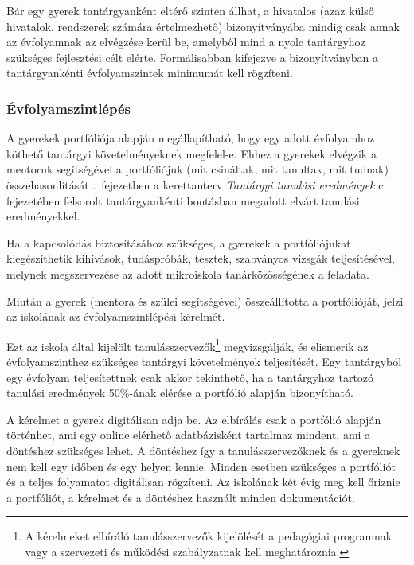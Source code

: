 Bár egy gyerek tantárgyanként eltérő szinten állhat, a hivatalos (azaz külső hivatalok, rendszerek számára értelmezhető) bizonyítványába mindig csak annak az évfolyamnak az elvégzése kerül be, amelyből mind a nyolc tantárgyhoz szükséges fejlesztési célt elérte. Formálisabban kifejezve a bizonyítványban a tantárgyankénti évfolyamszintek minimumát kell rögzíteni.

\subsubsection{Évfolyamszintlépés}
\label{sec:evfolyamszintlepes}
A gyerekek portfóliója alapján megállapítható, hogy egy adott évfolyamhoz köthető tantárgyi követelményeknek megfelel-e. Ehhez a gyerekek elvégzik a mentoruk segítségével a portfóliójuk (mit csináltak, mit tanultak, mit tudnak) összehasonlítását \ifkerettanterv
      .~fejezetben
\else
      a kerettanterv \emph{Tantárgyi tanulási eredmények} c. fejezetében
\fi felsorolt tantárgyankénti bontásban megadott elvárt tanulási eredményekkel.

Ha a kapcsolódás biztosításához szükséges, a gyerekek a portfóliójukat kiegészíthetik kihívások, tudáspróbák, tesztek, szabványos vizsgák teljesítésével, melynek megszervezése az adott mikroiskola tanárközösségének a feladata.

Miután a gyerek (mentora és szülei segítségével) összeállította a portfólió\-ját, jelzi az iskolának az évfolyamszintlépési kérelmét.

Ezt az iskola által kijelölt tanulásszervezők\footnote{A kérelmeket elbíráló tanulásszervezők kijelölését a pedagógiai programnak vagy a szervezeti és működési szabályzatnak kell meghatároznia.}   megvizsgálják, és elismerik az évfolyamszinthez szükséges tantárgyi követelmények teljesítését. Egy tantárgyból egy évfolyam teljesítettnek csak akkor tekinthető, ha a tantárgyhoz tartozó tanulási eredmények 50\%-ának elérése a portfólió alapján bizonyítható.

A kérelmet a gyerek digitálisan adja be. Az elbírálás csak a portfólió alapján történhet, ami egy online elérhető adatbázisként tartalmaz mindent, ami a döntéshez szükséges lehet. A döntéshez így a tanulásszervezőknek és a gyereknek nem kell egy időben és egy helyen lennie. Minden esetben szükséges a portfóliót és a teljes folyamatot digitálisan rögzíteni. Az iskolának két évig meg kell őriznie a portfóliót, a kérelmet és a döntéshez használt minden dokumentációt.

